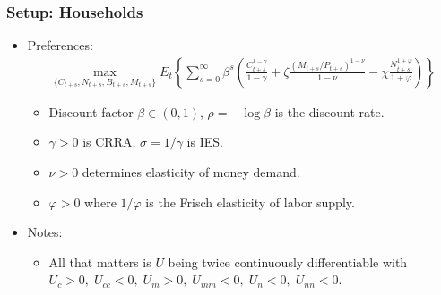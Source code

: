 \documentclass[english,xcolor=svgnames]{beamer}
\begin{document}
\begin{frame}
\frametitle{Setup: Households}
\begin{itemize}
	\item Preferences:
	\begin{align*}
		\max_{\{C_{t+s},N_{t+s},B_{t+s},M_{t+s}\}} E_t \left\{\sum_{s=0}^{\infty}\beta^s\left(\frac{C_{t+s}^{1-\gamma}}{1-\gamma}+\zeta\frac{(M_{t+s}/P_{t+s})^{1-\nu}}{1-\nu}-\chi \frac{N_{t+s}^{1+\varphi}}{1+\varphi}\right)\right\}
	\end{align*}
	\begin{itemize}
		\item Discount factor $\beta\in(0,1)$, $\rho=-\log \beta$ is the discount rate.
		\item $\gamma>0$ is CRRA, $\sigma=1/\gamma$ is IES.
		\item $\nu>0$ determines elasticity of money demand.
		\item $\varphi>0$ where $1/\varphi$ is the Frisch elasticity of labor supply. 
	\end{itemize}
	\item Notes:
	\begin{itemize}
		\item All that matters is $U$ being twice continuously differentiable with $U_c>0,\; U_{cc}<0,\;U_m>0,\; U_{mm}<0,\; U_n<0,\; U_{nn}<0$.
	\end{itemize}
\end{itemize}
\end{frame}
\end{document}
